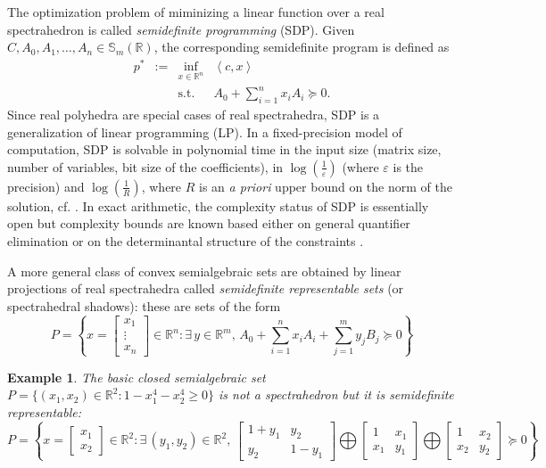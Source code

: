 \documentclass[a4paper,12pt]{article}
\newtheorem{example}{Example}
\newcommand{\R}{\mathbb{R}} %
\newcommand{\sym}{\mathbb{S}} %
\begin{document}
The optimization problem of miminizing a linear function over a real spectrahedron is called {\it semidefinite programming} (SDP). Given $C,A_0,A_1,\ldots,A_n \in \sym_m(\R)$, the corresponding semidefinite program is defined as
\begin{equation}
  \label{SDP}
\begin{array}{rcll}
  p^* & := & \inf_{x \in \R^n} & \left\langle c, x \right\rangle \\
  &    & \text{s.t.}         & A_0+\sum_{i=1}^n x_i A_i \succeq 0.
\end{array}
\end{equation}
Since real polyhedra are special cases of real spectrahedra, SDP is a generalization of linear programming (LP).
In a fixed-precision model of computation, SDP is solvable in polynomial time in the input size (matrix size,
number of variables, bit size of the coefficients), in $\log(\frac{1}{\varepsilon})$ (where $\varepsilon$ is the
precision) and $\log(\frac{1}{R})$, where $R$ is an {\it a priori} upper bound on the norm of the solution,
cf. \cite[Sec.1.9]{deKlerk}. In exact arithmetic, the complexity status of SDP is essentially open but complexity
bounds are known based either on general quantifier elimination \cite{ramana1997exact,porkolab1997complexity}
or on the determinantal structure of the constraints \cite{henrion2016exact}.

A more general class of convex semialgebraic sets are obtained by linear projections of real spectrahedra
called {\it semidefinite representable sets} (or spectrahedral shadows): these are sets of the form
$$
P = \left\{x = \left[\begin{smallmatrix} x_1 \\ \vdots \\ x_n \end{smallmatrix}\right] \in \R^n : \exists\,y\in\R^m, \, A_0 + \sum_{i=1}^n x_i A_i + \sum_{j=1}^m y_j B_j \succeq 0\right\}
$$

\begin{example}
\label{fermat_quartic}
The basic closed semialgebraic set $P = \{(x_1,x_2) \in \R^2 : 1-x_1^4-x_2^4 \geq 0\}$ is not a spectrahedron
but it is semidefinite representable:
$$
P = \left\{x = \begin{bmatrix} x_1 \\ x_2 \end{bmatrix} \in \R^2 :
\exists\, (y_1,y_2) \in \R^2, \,
\begin{bmatrix}
  1+y_1 & y_2 \\
  y_2 & 1-y_1
\end{bmatrix}
\bigoplus
\begin{bmatrix}
  1 & x_1 \\
  x_1 & y_1
\end{bmatrix}
\bigoplus
\begin{bmatrix}
  1 & x_2 \\
  x_2 & y_2
\end{bmatrix}
\succeq 0
\right\}
$$
\end{example}
\end{document}

